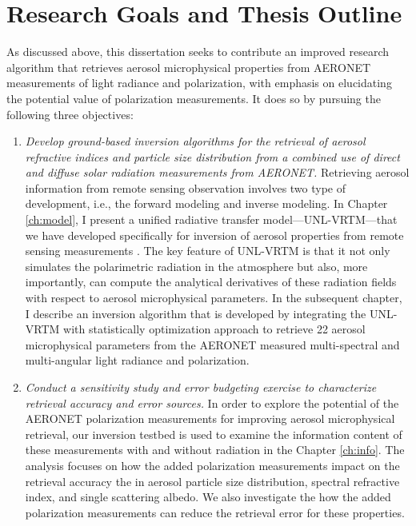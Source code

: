 \section{Research Goals and Thesis Outline} \label{sec:objective}

As discussed above, this dissertation seeks to contribute an improved
research algorithm that retrieves aerosol microphysical properties from AERONET
measurements of light radiance and polarization, with emphasis on elucidating
the potential value of polarization measurements. It does so by 
pursuing the following three objectives:

\begin{enumerate}
\item \textit{Develop ground-based inversion algorithms for the
retrieval of aerosol refractive indices and particle size distribution from a 
combined use of direct and diffuse solar radiation measurements from AERONET.}
\newline
Retrieving aerosol information from remote sensing observation
involves two type of development, i.e., the forward modeling and inverse
modeling. In Chapter \ref{ch:model}, I present a unified radiative transfer 
model---UNL-VRTM---that we have developed specifically for inversion of
aerosol properties from remote sensing measurements \citep{Wang14}. The
key feature of UNL-VRTM is that it not only simulates the
polarimetric radiation in the atmosphere but also, more importantly,
can compute the analytical derivatives of these radiation fields with respect
to aerosol microphysical parameters. In the subsequent chapter, I
describe an inversion algorithm that is developed by integrating the UNL-VRTM 
with statistically optimization approach to retrieve 22 aerosol
microphysical parameters from the AERONET measured multi-spectral and
multi-angular light radiance and polarization. 

\item \textit{Conduct a sensitivity study and error budgeting exercise to
characterize retrieval accuracy and error sources.} 
\newline 
In order to explore the potential of the AERONET polarization measurements
for improving aerosol microphysical retrieval, our inversion testbed is
used to examine the information content of these measurements with and without
radiation in the Chapter \ref{ch:info}. The analysis focuses on
how the added polarization measurements impact on the retrieval accuracy
the in aerosol particle size distribution, spectral refractive
index, and single scattering albedo. We also investigate the how the 
added polarization measurements can reduce the retrieval error for these
properties.  


\end{enumerate}
